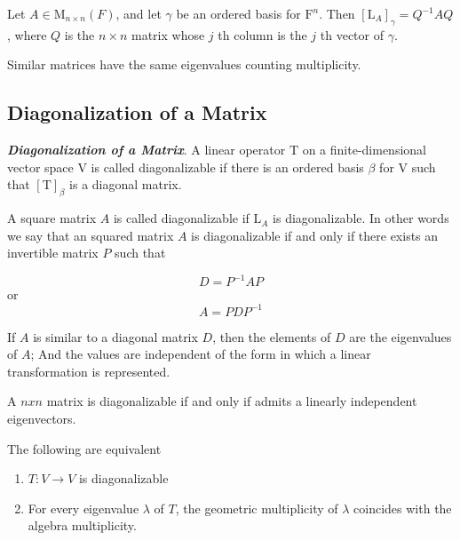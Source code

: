 \documentclass{report}
\begin{document}
    \begin{thBox}
        Let $A \in \mathrm{M}_{n \times n}(F)$, and let $\gamma$ be an ordered basis for $\mathrm{F}^n$. Then $\left[\mathrm{L}_A\right]_\gamma=Q^{-1} A Q$, where $Q$ is the $n \times n$ matrix whose $j$ th column is the $j$ th vector of $\gamma$.
    \end{thBox}

    \begin{thBox}
        Similar matrices have the same eigenvalues counting multiplicity.
    \end{thBox}

    \subsection*{Diagonalization of a Matrix}

    \begin{defBox}
        \textit{\textbf{Diagonalization of a Matrix}}. A linear operator $\mathrm{T}$ on a finite-dimensional vector space $\mathrm{V}$ is called diagonalizable if there is an ordered basis $\beta$ for $\mathrm{V}$ such that $[\mathrm{T}]_\beta$ is a diagonal matrix.

        A square matrix $A$ is called diagonalizable if $\mathrm{L}_A$ is diagonalizable. In other words we say that an squared matrix $A$ is diagonalizable if and only if there exists an invertible matrix $P$ such that

        $$D = P^{-1}AP$$ or
        $$A = PDP^{-1}$$
    \end{defBox}

    \begin{thBox}
        If $A$ is similar to a diagonal matrix $D$, then the elements of $D$ are the eigenvalues of $A$; And the values are independent of the form in which a linear transformation is represented.
    \end{thBox}

    \begin{thBox}
        A $nxn$ matrix is diagonalizable if and only if admits a linearly independent eigenvectors.
    \end{thBox}

    \begin{thBox}
        The following are equivalent

        \begin{enumerate}
            \item $T: V \to V$ is diagonalizable
            \item For every eigenvalue $\lambda$ of $T$, the geometric multiplicity of $\lambda$ coincides with the algebra multiplicity.
        \end{enumerate}
    \end{thBox}
\end{document}
